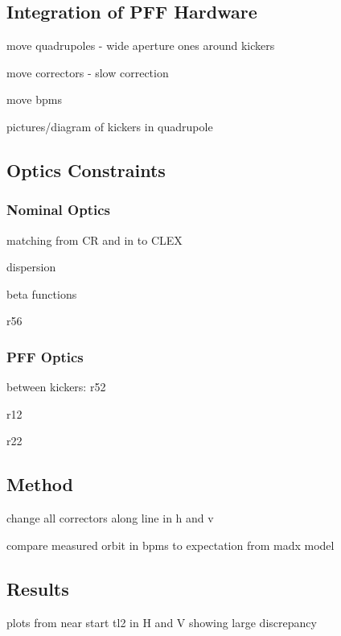 \subsection{Integration of PFF Hardware}
\label{ss:tl2PFFIntegration}

move quadrupoles - wide aperture ones around kickers

move correctors - slow correction

move bpms

pictures/diagram of kickers in quadrupole

\subsection{Optics Constraints}
\label{ss:tl2OpticsReqs}

\subsubsection{Nominal Optics}
\label{sss:nominalOpticsReqs}

matching from CR and in to CLEX

dispersion

beta functions

r56

\subsubsection{PFF Optics}
\label{sss:pffOpticsReqs}

between kickers: 
r52

r12

r22


\subsection{Method}
\label{ss:opticsMethod}

change all correctors along line in h and v

compare measured orbit in bpms to expectation from madx model

\subsection{Results}
\label{ss:opticsResults}

plots from near start tl2 in H and V showing large discrepancy

